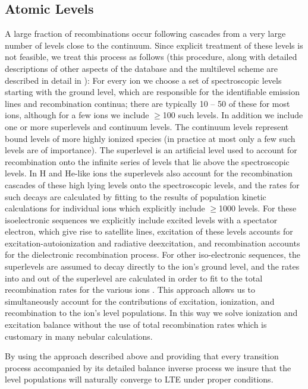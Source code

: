 \subsection{Atomic Levels}

A large fraction of recombinations occur following cascades 
from a very large number of levels close to the continuum.  Since 
explicit treatment of these levels is not feasible, we treat this process 
as follows (this procedure, along with detailed descriptions of 
other aspects of the database and 
the multilevel scheme are described in detail in \cite{bautista2000}):  
For every ion we choose a set of
spectroscopic levels starting with the ground level, which are responsible 
for the identifiable emission lines and recombination continua; there are 
typically 10 -- 50 of these for most ions, although for a few ions we include 
$\geq$100 such levels.  In addition
we include one or more superlevels and continuum levels. The continuum levels represent
bound levels of more highly ionized species (in practice at most only a few such levels 
are of importance).  The  superlevel is an artificial level used to account for 
recombination onto the infinite series of levels that lie above the spectroscopic levels. 
In H and He-like ions the superlevels also account for the 
recombination cascades of these high lying levels onto the spectroscopic
levels, and the rates for such decays are calculated by fitting to the results of 
population kinetic calculations for individual ions which explicitly include $\geq$1000 levels.
For these isoelectronic sequences we explicitly include 
excited levels with a spectator electron, which give rise to satellite lines, 
excitation of these levels accounts for excitation-autoionization and radiative deexcitation, 
and recombination accounts for the dielectronic recombination
process.  For other iso-electronic sequences, the superlevels are 
assumed to decay directly to the ion's ground level, and the rates into and out of the
superlevel are calculated in order to fit to the total recombination rates 
for the various ions \cite{bautista2000}.  This approach   
allows us to simultaneously account for the contributions of excitation, ionization, and 
recombination to the ion's level populations.   In this way we solve 
ionization and excitation balance without the use of total recombination rates
which is customary in many nebular calculations.

By using the  approach described above and providing that every
transition process accompanied by its detailed balance inverse process 
we insure that the level populations will 
naturally converge to LTE under proper conditions. 


